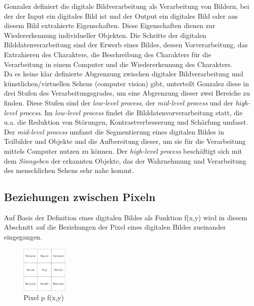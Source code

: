 \documentclass[ngerman,12pt]{article} %
\begin{document}
Gonzalez definiert die digitale Bildverarbeitung als Verarbeitung von Bildern, bei der der Input ein digitales Bild ist und der Output ein digitales Bild oder aus diesem Bild extrahierte Eigenschaften. Diese Eigenschaften dienen zur Wiedererkennung individueller Objekten. Die Schritte der digitalen Bilddatenverarbeitung sind der Erwerb eines Bildes, dessen Vorverarbeitung, das Extrahieren des Charakters, die Beschreibung des Charakters für die Verarbeitung in einem Computer und die Wiedererkennung des Charakters.\\
Da es keine klar definierte Abgrenzung zwischen digitaler Bildverarbeitung und künstlichen/virtuellen Sehens (computer vision) gibt, unterteilt Gonzalez diese in drei Stufen des Verarbeitungsgrades, um eine Abgrenzung dieser zwei Bereiche zu finden. Diese Stufen sind der \textit{low-level process}, der \textit{mid-level process} und der \textit{high-level process}. Im \textit{low-level process} findet die Bilddatenvorverarbeitung statt, die u.a. die Reduktion von Störungen, Kontrastverbesserung und Schärfung umfasst. Der \textit{mid-level process} umfasst die Segmentierung eines digitalen Bildes in Teilbilder und Objekte und die Aufbereitung dieser, um sie für die Verarbeitung mittels Computer nutzen zu können. Der \textit{high-level process} beschäftigt sich mit dem \textit{Sinngeben} der erkannten Objekte, das der Wahrnehmung und Verarbeitung des menschlichen Sehens sehr nahe kommt.



\subsection{Beziehungen zwischen Pixeln}
\label{sec:Beziehungen zwischen Pixeln}
Auf Basis der Definition eines digitalen Bildes als Funktion f(x,y) wird in diesem Abschnitt auf die Beziehungen der Pixel eines digitalen Bildes zueinander eingegangen.\\

\begin{figure} [h!tb]
	\begin{center}
	\includegraphics[width=0.2\textwidth]{Pixel p f(x,y)}
	\caption[Pixel p f(x,y)]{\label{pic:Pixel p f(x,y)}Pixel p f(x,y)}
	\end{center}
\end{figure}
\end{document}
